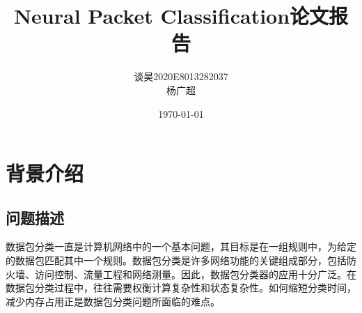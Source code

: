 \documentclass[UTF8,a4paper]{ctexart}
\title{\bfseries Neural Packet Classification论文报告 }
\author{谈昊\quad2020E8013282037\\杨广超\quad202028013229114}
\date{\today}
\begin{document}
\maketitle





\section{背景介绍}
\subsection{问题描述}
数据包分类一直是计算机网络中的一个基本问题，其目标是在一组规则中，为给定的数据包匹配其中一个规则。数据包分类是许多网络功能的关键组成部分，包括防火墙、访问控制、流量工程和网络测量。因此，数据包分类器的应用十分广泛。在数据包分类过程中，往往需要权衡计算复杂性和状态复杂性。如何缩短分类时间，减少内存占用正是数据包分类问题所面临的难点。
\end{document}
